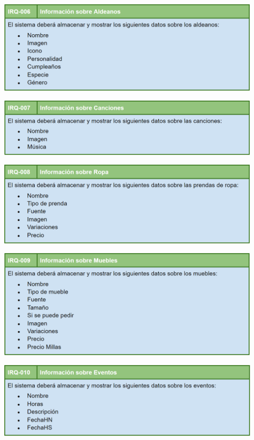 	\bigskip
	
	\includegraphics[width=\textwidth]{img/cap5/IR/6.png}
	
	\bigskip
	
	\includegraphics[width=\textwidth]{img/cap5/IR/7.png}
	
	\bigskip
	
	\includegraphics[width=\textwidth]{img/cap5/IR/8.png}
	
	\bigskip
	
	\includegraphics[width=\textwidth]{img/cap5/IR/9.png}
	
	\bigskip
	
	\includegraphics[width=\textwidth]{img/cap5/IR/10.png}
		
